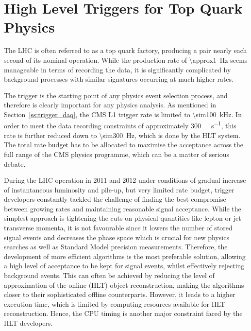 
\chapter{High Level Triggers for Top Quark Physics}
\label{c:service_work}
\ifpdf
    \graphicspath{{04_Service_work/plots/}}
\else
    \graphicspath{{04_Service_work/plots/EPS/}{04_Service_work/plots/}}
\fi

The LHC is often referred to as a top quark factory, producing a \ttbar pair nearly each second of its nominal
operation. While the production rate of \SI{\approx1}{\Hz} seems manageable in terms of recording the data, it is
significantly complicated by background processes with similar signatures occurring at much higher rates.

The trigger is the starting point of any physics event selection process, and therefore is clearly important for any
physics analysis. As mentioned in Section~\ref{ss:trigger_daq}, the CMS L1 trigger rate is limited to
\SI{\sim100}{\kilo\hertz}. In order to meet the data recording constraints of approximately
\SI{300}{\mega\byte\per\second}, this rate is further reduced down to \SI{\sim300}{\Hz}, which is done by the HLT
system. The total rate budget has to be allocated to maximise the acceptance across the full range of the CMS physics
programme, which can be a matter of serious debate.

During the LHC operation in 2011 and 2012 under conditions of gradual increase of instantaneous luminosity and pile-up,
but very limited rate budget, trigger developers constantly tackled the challenge of finding the best compromise between
growing rates and maintaining reasonable signal acceptance. While the simplest approach is tightening the cuts on
physical quantities like lepton or jet transverse momenta, it is not favourable since it lowers the number of stored
signal events and decreases the phase space which is crucial for new physics searches as well as Standard Model
precision measurements. Therefore, the development of more efficient algorithms is the most preferable solution,
allowing a high level of acceptance to be kept for signal events, whilst effectively rejecting background events. This
can often be achieved by reducing the level of approximation of the online (HLT) object reconstruction, making the
algorithms closer to their sophisticated offline counterparts. However, it leads to a higher execution time, which is
limited by computing resources available for HLT reconstruction. Hence, the CPU timing is another major constraint faced
by the HLT developers.

